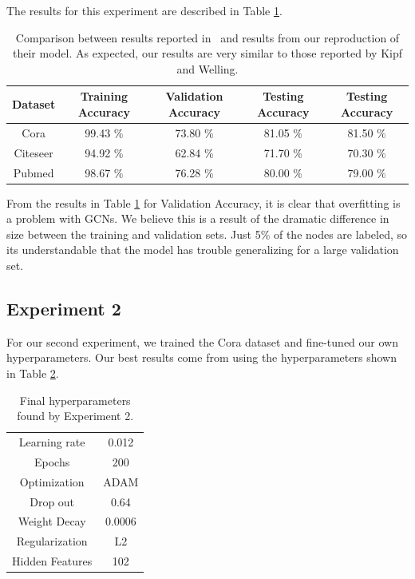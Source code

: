  The results for this experiment are described in Table \ref{tab:results1}.

\begin {table}[ht!]
  \begin{center}
    \begin{tabular}{|c|c|c|c|c|}
    \hline
    Dataset    &  Training Accuracy & Validation Accuracy & Testing Accuracy & \cite{Kipf2016} Testing Accuracy \\ \hline
    Cora          & 99.43 \% & 73.80 \%  & 81.05 \% & 81.50 \% \\ 
    Citeseer      & 94.92 \% & 62.84 \%  & 71.70 \% & 70.30 \% \\
    Pubmed        & 98.67 \% & 76.28 \%  & 80.00 \% & 79.00 \% \\
    \hline
    \end{tabular}
  \end{center}
\caption {Comparison between results reported in~\cite{Kipf2016} and results from our reproduction of their model. As expected, our results are very similar to those reported by Kipf and Welling.} \label{tab:results1} 
\end{table}

From the results in Table \ref{tab:results1} for Validation Accuracy, it is clear that overfitting is a problem with GCNs. We believe this is a result of the dramatic difference in size between the training and validation sets. Just 5\% of the nodes are labeled, so its understandable that the model has trouble generalizing for a large validation set. 

\subsection{Experiment 2}
For our second experiment, we trained the Cora dataset and fine-tuned our own hyperparameters. Our best results come from using the hyperparameters shown in Table \ref{tab:hyperparameters2}.

\begin {table}[ht!]
  \begin{center}
    \begin{tabular}{|c|c|}
    \hline
    Learning rate     & 0.012 \\ 
    Epochs            & 200  \\ 
    Optimization      & ADAM \\
    Drop out          & 0.64   \\
    Weight Decay      & 0.0006 \\
    Regularization    & L2    \\
    Hidden Features   & 102   \\
    \hline
    \end{tabular}
  \end{center}
\caption {Final hyperparameters found by Experiment 2.} \label{tab:hyperparameters2} 
\end{table}

